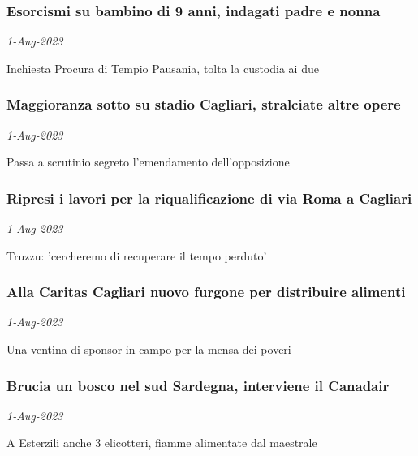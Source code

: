 \subsubsection{Esorcismi su bambino di 9 anni, indagati padre e nonna \href{https://www.ansa.it/sardegna/notizie/2023/08/01/esorcismi-su-bambino-di-9-anni-indagati-padre-e-nonna_ed0da6c6-a099-4b67-bc4d-3c44816a4199.html}{}}
\textit{1-Aug-2023}

Inchiesta Procura di Tempio Pausania, tolta la custodia ai due
\subsubsection{Maggioranza sotto su stadio Cagliari, stralciate altre opere \href{https://www.ansa.it/sardegna/notizie/2023/08/01/maggioranza-sotto-su-stadio-cagliari-stralciate-altre-opere_4508c45b-bec6-440e-9346-2c377f5072b6.html}{}}
\textit{1-Aug-2023}

Passa a scrutinio segreto l'emendamento dell'opposizione
\subsubsection{Ripresi i lavori per la riqualificazione di via Roma a Cagliari \href{https://www.ansa.it/sardegna/notizie/2023/08/01/ripresi-i-lavori-per-la-riqualificazione-di-via-roma-a-cagliari_f092549e-6f2e-499a-b3c8-a8af69eba937.html}{}}
\textit{1-Aug-2023}

Truzzu: 'cercheremo di recuperare il tempo perduto'
\subsubsection{Alla Caritas Cagliari nuovo furgone per distribuire alimenti \href{https://www.ansa.it/sardegna/notizie/2023/08/01/alla-caritas-cagliari-nuovo-furgone-per-distribuire-alimenti_f4ad3a09-156f-48c0-9f28-a5e6b0b52742.html}{}}
\textit{1-Aug-2023}

Una ventina di sponsor in campo per la mensa dei poveri
\subsubsection{Brucia un bosco nel sud Sardegna, interviene il Canadair \href{https://www.ansa.it/sardegna/notizie/2023/08/01/brucia-un-bosco-nel-sud-sardegna-interviene-il-canadair_0fec515e-5f40-43ee-9687-8810aa78c38c.html}{}}
\textit{1-Aug-2023}

A Esterzili anche 3 elicotteri, fiamme alimentate dal maestrale
